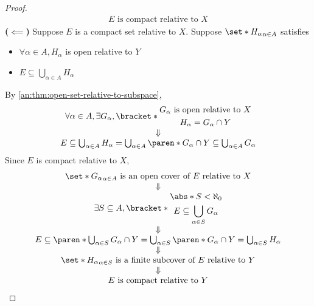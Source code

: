 \begin{proof}
\[\begin{array}{c}
      E \text{ is compact relative to } X
    \end{array}
  \]
  \textbf{($\impliedby$)} Suppose $E$ is a compact set relative to $X$. Suppose $\set*{H_{\alpha}}_{\alpha \in A}$ satisfies
  \begin{itemize}
    \item $\forall \alpha \in A, H_{\alpha}$ is open relative to $Y$
    \item $E \subseteq \bigcup_{\alpha \in A} H_{\alpha}$
  \end{itemize}
  By \cref{an:thm:open-set-relative-to-subspace},
  \[
    \begin{array}{c}
      \forall \alpha \in A, \exists G_{\alpha},
      \bracket*{\begin{gathered}
          G_{\alpha} \text{ is open relative to } X \\
          H_{\alpha} = G_{\alpha} \cap Y
        \end{gathered}} \\
      \Downarrow                                    \\
      E \subseteq \bigcup_{\alpha \in A} H_{\alpha} = \bigcup_{\alpha \in A}
      \paren*{G_{\alpha} \cap Y} \subseteq \bigcup_{\alpha \in A} G_{\alpha}
    \end{array}
  \]
  Since $E$ is compact relative to $X$,
  \[
    \begin{array}{c}
      \set*{G_{\alpha}}_{\alpha \in A} \text{ is an open cover of } E \text{ relative to } X     \\
      \Downarrow                                                                                 \\
      \exists S \subseteq A,
      \bracket*{\begin{gathered}
          \abs*{S} < \aleph_{0} \\
          E \subseteq \bigcup_{\alpha \in S} G_{\alpha}
        \end{gathered}}                                           \\
      \Downarrow                                                                                 \\
      E \subseteq \paren*{\bigcup_{\alpha \in S} G_{\alpha}} \cap Y = \bigcup_{\alpha \in S}
      \paren*{G_{\alpha} \cap Y} = \bigcup_{\alpha \in S} H_{\alpha}                             \\
      \Downarrow                                                                                 \\
      \set*{H_{\alpha}}_{\alpha \in S} \text{ is a finite subcover of } E \text{ relative to } Y \\
      \Downarrow                                                                                 \\
      E \text{ is compact relative to } Y
    \end{array}
  \]
\end{proof}

